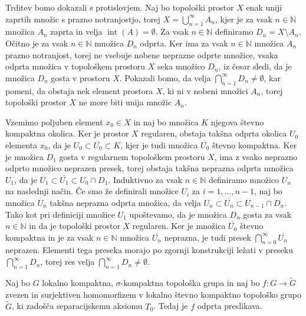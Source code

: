 \documentclass[mat1]{fmfdelo}
\newcommand{\N}{\mathbb N}
\newcommand{\closure}[1]{\overline{#1}}
\DeclareMathOperator{\interior}{int}
\begin{document}
\begin{dokaz}
Trditev bomo dokazali s protislovjem. Naj bo topološki prostor $X$ enak uniji zaprtih množic s prazno notranjostjo, torej $X = \bigcup_{n=1}^\infty A_n$, kjer je za vsak $n \in \N$ množica $A_n$ zaprta in velja $\interior(A) = \emptyset$. Za vsak $n \in \N$ definiramo $D_n = X \setminus A_n$. Očitno je za vsak $n \in \N$ množica $D_n$ odprta. Ker ima za vsak $n \in \N$ množica $A_n$ prazno notranjost, torej ne vsebuje nobene neprazne odprte množice, vsaka odprta množica v topološkem prostoru $X$ seka množico $D_n$, iz česar sledi, da je množica $D_n$ gosta v prostoru $X$. Pokazali bomo, da velja $\bigcap_{n=1}^\infty D_n \neq \emptyset$, kar pomeni, da obstaja nek element prostora $X$, ki ni v nobeni množici $A_n$, torej topološki prostor $X$ ne more biti unija množic $A_n$.

Vzemimo poljuben element $x_0 \in X$ in naj bo množica $K$ njegova števno kompaktna okolica. Ker je prostor $X$ regularen, obstaja takšna odprta okolica $U_0$ elementa $x_0$, da je $U_0 \subset \closure{U_0} \subset K$, kjer je tudi množica $\closure{U_0}$ števno kompaktna. Ker je množica $D_1$ gosta v regularnem topološkem prostoru $X$, ima z vsako neprazno odprto množico neprazen presek, torej obstaja takšna neprazna odprta množica $U_1$, da je $U_1 \subset \closure{U_1} \subset U_0 \cap D_1$. Induktivno za vsak $n \in \N$ definiramo množico $U_n$ na naslednji način. Če smo že definirali množice $U_i$ za $i = 1,\dots,n-1$, naj bo množica $U_n$ takšna neprazna odprta množica, da velja $U_n \subset \closure{U_n} \subset U_{n-1} \cap D_n$. Tako kot pri definiciji množice $U_1$ upoštevamo, da je množica $D_n$ gosta za vsak $n \in \N$ in da je topološki prostor $X$ regularen.
Ker je množica $\closure{U_0}$ števno kompaktna in je za vsak $n \in \N$ množica $\closure{U_n}$ neprazna, je tudi presek $\bigcap_{n=0}^\infty \closure{U_n}$ neprazen. Elementi tega preseka morajo po zgornji konstrukciji ležati v preseku $\bigcap_{n=1}^\infty D_n$, torej res velja $\bigcap_{n=1}^\infty D_n \neq \emptyset$.
\end{dokaz}

\begin{trditev}\label{trd:kompodp}
Naj bo $G$ lokalno kompaktna, $\sigma$-kompaktna topološka grupa in naj bo $f\colon G \to \widetilde{G}$ zvezen in surjektiven homomorfizem v lokalno števno kompaktno topološko grupo $\widetilde{G}$, ki zadošča separacijskemu aksiomu $T_0$. Tedaj je $f$ odprta preslikava.
\end{trditev}
\end{document}

